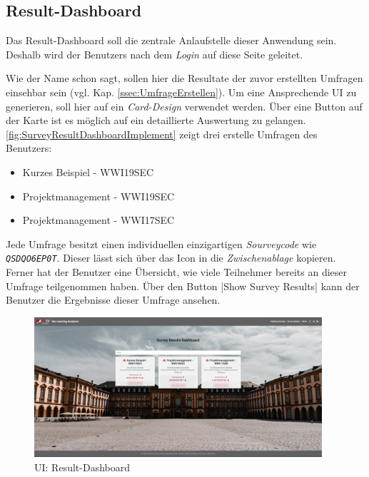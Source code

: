 
\subsection{Result-Dashboard}
\label{ssec:ResultDashboardImplement}

Das Result-Dashboard soll die zentrale Anlaufstelle dieser Anwendung sein. 
Deshalb wird der Benutzers nach dem \emph{Login} auf diese Seite geleitet. 

Wie der Name schon sagt, sollen hier die Resultate der zuvor erstellten Umfragen einsehbar sein (vgl. Kap. \vref{ssec:UmfrageErstellen}).  
Um eine Ansprechende \ac{UI} zu generieren, soll hier auf ein \emph{Card-Design} verwendet werden. 
Über eine Button auf der Karte ist es möglich auf ein detaillierte Auswertung zu gelangen. \newline
\abb \vref{fig:SurveyResultDashboardImplement} zeigt drei erstelle Umfragen des Benutzers: 
% 
\begin{itemize}
	\item Kurzes Beispiel - WWI19SEC
	\item Projektmanagement - WWI19SEC
	\item Projektmanagement - WWI17SEC
\end{itemize}
% 
Jede Umfrage besitzt einen individuellen einzigartigen \emph{Sourveycode} wie \zb \emph{\texttt{QSDQO6EP0T}}. 
Dieser lässt sich über das Icon \faClipboard\xspace in die \emph{Zwischenablage} kopieren. 
Ferner hat der Benutzer eine Übersicht, wie viele Teilnehmer  bereits an dieser Umfrage teilgenommen haben. 
Über den Button \jinline|Show Survey Results| kann der Benutzer die Ergebnisse dieser Umfrage ansehen. 

\begin{figure}[!htb]
	\centering
	\includegraphics[width=0.95\textwidth, keepaspectratio]{img/client/SurveyResultDashboard.png}
	\captionsetup{justification=centering, format=plain}
	\caption[\acf{UI}: Result-Dashboard]{\acf{UI}: Result-Dashboard \\ \quelleScreenshot}
	\label{fig:SurveyResultDashboardImplement}
\end{figure}

